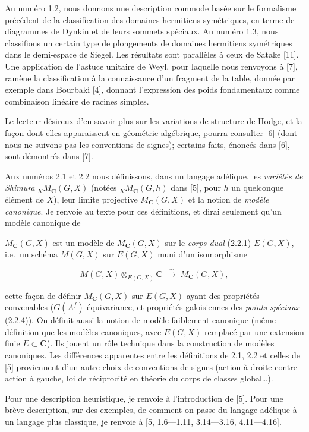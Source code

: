 \documentclass[10pt,a4paper]{article}
\newcommand{\SourcePage}[2]{\clearpage\setcounter{page}{#2}\typeout{D031_SOURCE_PAGE physical=#1 printed=#2}}
\begin{document}
Au numéro 1.2, nous donnons une description commode basée sur le formalisme précédent de la classification des domaines hermitiens symétriques, en terme de diagrammes de Dynkin et de leurs sommets spéciaux. Au numéro 1.3, nous classifions un certain type de plongements de domaines hermitiens symétriques dans le demi-espace de Siegel. Les résultats sont parallèles à ceux de Satake {[}11{]}. Une application de l'astuce unitaire de Weyl, pour laquelle nous renvoyons à {[}7{]}, ramène la classification à la connaissance d'un fragment de la table, donnée par exemple dans Bourbaki {[}4{]}, donnant l'expression des poids fondamentaux comme combinaison linéaire de racines simples.

Le lecteur désireux d'en savoir plus sur les variations de structure de Hodge, et la façon dont elles apparaissent en géométrie algébrique, pourra consulter {[}6{]} (dont nous ne suivons pas les conventions de signes); certains faits, énoncés dans {[}6{]}, sont démontrés dans {[}7{]}.

Aux numéros 2.1 et 2.2 nous définissons, dans un langage adélique, les \emph{variétés de Shimura} \({}_K M_{\mathbf C}(G,X)\) (notées \({}_K M_{\mathbf C}(G,h)\) dans {[}5{]}, pour \(h\) un quelconque élément de \(X\)), leur limite projective \(M_{\mathbf C}(G,X)\) et la notion de \emph{modèle canonique}. Je renvoie au texte pour ces définitions, et dirai seulement qu'un modèle canonique de

\SourcePage{3}{249}
\(M_{\mathbf C}(G,X)\) est un modèle de \(M_{\mathbf C}(G,X)\) sur le \emph{corps dual} (2.2.1) \(E(G,X)\), i.e.~un schéma \(M(G,X)\) sur \(E(G,X)\) muni d'un isomorphisme

\[
M(G,X)\otimes_{E(G,X)}\mathbf C\;\xrightarrow{\sim}\;M_{\mathbf C}(G,X),
\]

cette façon de définir \(M_{\mathbf C}(G,X)\) sur \(E(G,X)\) ayant des propriétés convenables (\(G(A^f)\)-équivariance, et propriétés galoisiennes des \emph{points spéciaux} (2.2.4)). On définit aussi la notion de modèle faiblement canonique (même définition que les modèles canoniques, avec \(E(G,X)\) remplacé par une extension finie \(E\subset\mathbf C\)). Ils jouent un rôle technique dans la construction de modèles canoniques. Les différences apparentes entre les définitions de 2.1, 2.2 et celles de {[}5{]} proviennent d'un autre choix de conventions de signes (action à droite contre action à gauche, loi de réciprocité en théorie du corps de classes global\ldots).

Pour une description heuristique, je renvoie à l'introduction de {[}5{]}. Pour une brève description, sur des exemples, de comment on passe du langage adélique à un langage plus classique, je renvoie à {[}5, 1.6---1.11, 3.14---3.16, 4.11---4.16{]}.
\end{document}
